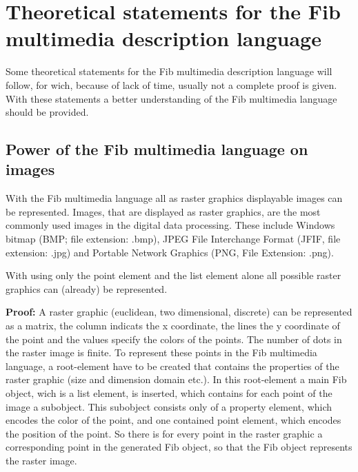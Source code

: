 %
%
%
%


\section{Theoretical statements for the Fib multimedia description language}
\label{secTheoreticFib}

Some theoretical statements for the Fib multimedia description language will follow, for wich, because of lack of time, usually not a complete proof is given. With these statements a better understanding of the Fib multimedia language should be provided.


\subsection{Power of the Fib multimedia language on images}
\label{secPowerOfFibOnPictures}

With the Fib multimedia language all as raster graphics displayable images can be represented. Images, that are displayed as raster graphics, are the most commonly used images in the digital data processing. These include Windows bitmap (BMP; file extension: .bmp), JPEG File Interchange Format (JFIF, file extension: .jpg) and Portable Network Graphics (PNG, File Extension: .png).

With using only the point element and the list element alone all possible raster graphics can (already) be represented.

\bigskip\noindent
\textbf{Proof:}
A raster graphic (euclidean, two dimensional, discrete) can be represented as a matrix, the column indicats the x coordinate, the lines the y coordinate of the point and the values specify the colors of the points. The number of dots in the raster image is finite. To represent these points in the Fib multimedia language, a root-element have to be created that contains the properties of the raster graphic (size and dimension domain etc.). In this root-element a main Fib object, wich is a list element, is inserted, which contains for each point of the image a subobject. This subobject consists only of a property element, which encodes the color of the point, and one contained point element, which encodes the position of the point. So there is for every point in the raster graphic a corresponding point in the generated Fib object, so that the Fib object represents the raster image.

